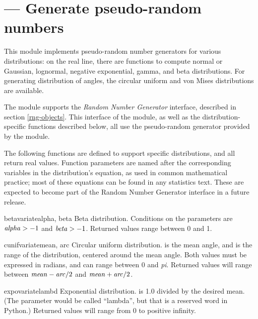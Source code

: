 \section{ ---
         Generate pseudo-random numbers}



This module implements pseudo-random number generators for various
distributions: on the real line, there are functions to compute normal
or Gaussian, lognormal, negative exponential, gamma, and beta
distributions.  For generating distribution of angles, the circular
uniform and von Mises distributions are available.


The  module supports the \emph{Random Number
Generator} interface, described in section \ref{rng-objects}.  This
interface of the module, as well as the distribution-specific
functions described below, all use the pseudo-random generator
provided by the  module.


The following functions are defined to support specific distributions,
and all return real values.  Function parameters are named after the
corresponding variables in the distribution's equation, as used in
common mathematical practice; most of these equations can be found in
any statistics text.  These are expected to become part of the Random
Number Generator interface in a future release.

\begin{funcdesc}{betavariate}{alpha, beta}
Beta distribution.  Conditions on the parameters are
$\mbox{\normalsize\textrm{\textit{alpha\/}}} > -1$ and $\mbox{\normalsize\textrm{\textit{beta\/}}} > -1$.
Returned values range between 0 and 1.
\end{funcdesc}

\begin{funcdesc}{cunifvariate}{mean, arc}
Circular uniform distribution.   is the mean angle, and
 is the range of the distribution, centered around the mean
angle.  Both values must be expressed in radians, and can range
between 0 and \emph{pi}.  Returned values will range between
$\mbox{\normalsize\textrm{\textit{mean\/}}} - \mbox{\normalsize\textrm{\textit{arc\/}}}/2$ and $\mbox{\normalsize\textrm{\textit{mean\/}}} + \mbox{\normalsize\textrm{\textit{arc\/}}}/2$.
\end{funcdesc}

\begin{funcdesc}{expovariate}{lambd}
Exponential distribution.   is 1.0 divided by the desired
mean.  (The parameter would be called ``lambda'', but that is a
reserved word in Python.)  Returned values will range from 0 to
positive infinity.
\end{funcdesc}

